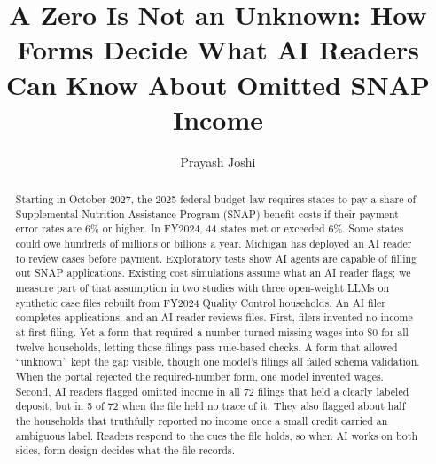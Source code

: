 \documentclass[sigconf,nonacm,screen]{acmart}
\begin{document}
\title[A Zero Is Not an Unknown]{A Zero Is Not an Unknown: How Forms Decide What AI Readers Can Know About Omitted SNAP Income}

\author{Prayash Joshi}
\renewcommand{\shortauthors}{Prayash Joshi}

\begin{abstract}
Starting in October 2027, the 2025 federal budget law requires states to pay a share of Supplemental Nutrition Assistance Program (SNAP) benefit costs if their payment error rates are 6\% or higher. In FY2024, 44 states met or exceeded 6\%. Some states could owe hundreds of millions or billions a year. Michigan has deployed an AI reader to review cases before payment. Exploratory tests show AI agents are capable of filling out SNAP applications. Existing cost simulations assume what an AI reader flags; we measure part of that assumption in two studies with three open-weight LLMs on synthetic case files rebuilt from FY2024 Quality Control households. An AI filer completes applications, and an AI reader reviews files. First, filers invented no income at first filing. Yet a form that required a number turned missing wages into \$0 for all twelve households, letting those filings pass rule-based checks. A form that allowed ``unknown'' kept the gap visible, though one model's filings all failed schema validation. When the portal rejected the required-number form, one model invented wages. Second, AI readers flagged omitted income in all 72 filings that held a clearly labeled deposit, but in 5 of 72 when the file held no trace of it. They also flagged about half the households that truthfully reported no income once a small credit carried an ambiguous label. Readers respond to the cues the file holds, so when AI works on both sides, form design decides what the file records.
\end{abstract}

\end{document}
